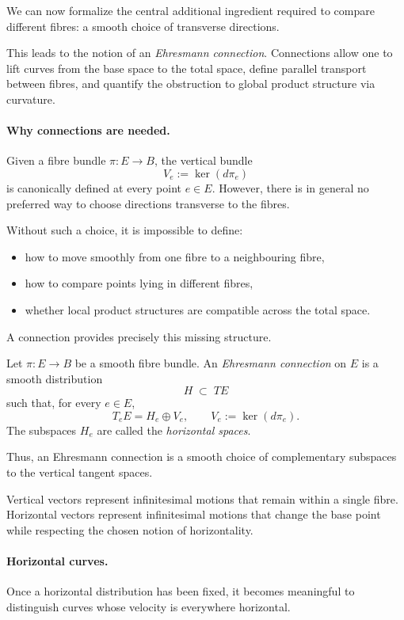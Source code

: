We can now formalize the central additional ingredient required to compare different fibres:
a smooth choice of transverse directions.

This leads to the notion of an \emph{Ehresmann connection}.
Connections allow one to lift curves from the base space to the total space, define
parallel transport between fibres, and quantify the obstruction to global product
structure via curvature.

\paragraph{Why connections are needed.}
Given a fibre bundle $\pi:E\to B$, the vertical bundle
\[
V_e := \ker(d\pi_e)
\]
is canonically defined at every point $e\in E$.
However, there is in general no preferred way to choose directions transverse to the
fibres.

Without such a choice, it is impossible to define:
\begin{itemize}
\item how to move smoothly from one fibre to a neighbouring fibre,
\item how to compare points lying in different fibres,
\item whether local product structures are compatible across the total space.
\end{itemize}

A connection provides precisely this missing structure.

\begin{gdefn}
Let $\pi:E\to B$ be a smooth fibre bundle.
An \emph{Ehresmann connection} on $E$ is a smooth distribution
\[
H \;\subset\; TE
\]
such that, for every $e\in E$,
\[
T_eE = H_e \oplus V_e,
\qquad
V_e := \ker(d\pi_e).
\]
The subspaces $H_e$ are called the \emph{horizontal spaces}.
\end{gdefn}

Thus, an Ehresmann connection is a smooth choice of complementary subspaces to the
vertical tangent spaces.

Vertical vectors represent infinitesimal motions that remain within a single fibre.
Horizontal vectors represent infinitesimal motions that change the base point while
respecting the chosen notion of horizontality.


\paragraph{Horizontal curves.}
Once a horizontal distribution has been fixed, it becomes meaningful to distinguish
curves whose velocity is everywhere horizontal.

